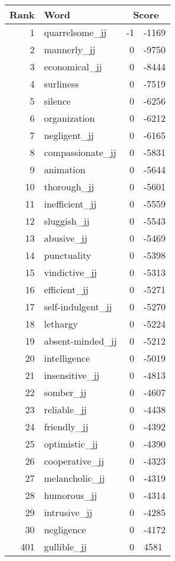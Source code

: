 \begin{longtable}[!htbp]{| rlr@{.}l |}
    \hline
    \textbf{Rank} & \textbf{Word} & \multicolumn{2}{c|}{\textbf{Score}} \\
    \hline
    \endhead
    1 & quarrelsome\_jj & -1 & -1169 \\
    2 & mannerly\_jj & 0 & -9750 \\
    3 & economical\_jj & 0 & -8444 \\
    4 & surliness & 0 & -7519 \\
    5 & silence & 0 & -6256 \\
    6 & organization & 0 & -6212 \\
    7 & negligent\_jj & 0 & -6165 \\
    8 & compassionate\_jj & 0 & -5831 \\
    9 & animation & 0 & -5644 \\
    10 & thorough\_jj & 0 & -5601 \\
    11 & inefficient\_jj & 0 & -5559 \\
    12 & sluggish\_jj & 0 & -5543 \\
    13 & abusive\_jj & 0 & -5469 \\
    14 & punctuality & 0 & -5398 \\
    15 & vindictive\_jj & 0 & -5313 \\
    16 & efficient\_jj & 0 & -5271 \\
    17 & self-indulgent\_jj & 0 & -5270 \\
    18 & lethargy & 0 & -5224 \\
    19 & absent-minded\_jj & 0 & -5212 \\
    20 & intelligence & 0 & -5019 \\
    21 & insensitive\_jj & 0 & -4813 \\
    22 & somber\_jj & 0 & -4607 \\
    23 & reliable\_jj & 0 & -4438 \\
    24 & friendly\_jj & 0 & -4392 \\
    25 & optimistic\_jj & 0 & -4390 \\
    26 & cooperative\_jj & 0 & -4323 \\
    27 & melancholic\_jj & 0 & -4319 \\
    28 & humorous\_jj & 0 & -4314 \\
    29 & intrusive\_jj & 0 & -4285 \\
    30 & negligence & 0 & -4172 \\
    401 & gullible\_jj & 0 & 4581 \\

\end{longtable}
